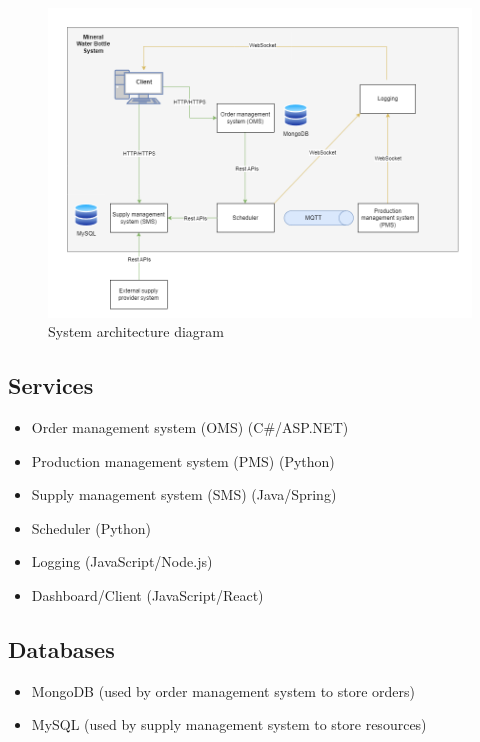 \documentclass[conference]{IEEEtran}
\begin{document}
\begin{figure}[h]
    \centering
    \includegraphics[width=1\linewidth]{diagrams/architecture-diagram.png}
    \caption{System architecture diagram}
    \label{fig:system-architecture}
\end{figure}

\subsection{Services}
\label{sec:services}
\begin{itemize}
    \item Order management system (OMS) (C\#/ASP.NET)
    \item Production management system (PMS) (Python)
    \item Supply management system (SMS) (Java/Spring)
    \item Scheduler (Python)
    \item Logging (JavaScript/Node.js)
    \item Dashboard/Client (JavaScript/React)
\end{itemize}

\subsection{Databases}
\label{sec:databases}
\begin{itemize}
    \item MongoDB (used by order management system to store orders)
    \item MySQL (used by supply management system to store resources)
\end{itemize}
\end{document}
